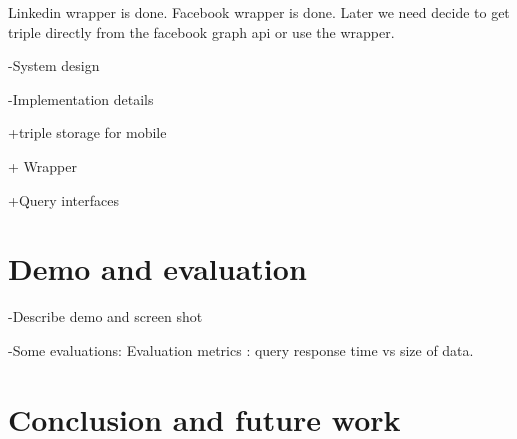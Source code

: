 \documentclass[runningheads,a4paper]{llncs}
\begin{document}
 Linkedin wrapper is done. 
 Facebook wrapper is done. 
Later we need decide to get triple directly from the facebook graph api or use the wrapper.


-System design

-Implementation details
	
	+triple storage for mobile ~\cite{Furstenau:2009}
	
	+ Wrapper
  
	+Query interfaces 

\section{Demo and evaluation}

-Describe demo and screen shot

-Some evaluations: Evaluation metrics : query response time vs size of data.

\section{Conclusion and future work}

%


\end{document}
